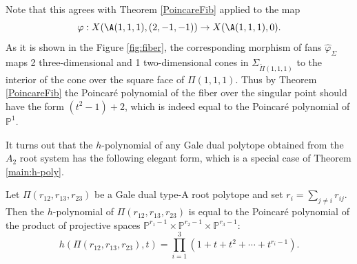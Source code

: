 \begin{rema}
Note that this agrees with Theorem \ref{PoincareFib} applied to the map 
$$\varphi: X(\A(1,1,1),(2,-1,-1)) \to X(\A(1,1,1), 0).$$ As it is shown in the 
Figure \ref{fig:fiber}, the corresponding morphism of fans 
$\widehat{\varphi}_\Sigma$ maps 2 three-dimensional and 1 two-dimensional cones 
in $\Sigma_{\widetilde{\Pi}(1,1,1)}$  to the interior of the cone over the 
square face of $\Pi(1,1,1)$. Thus by Theorem \ref{PoincareFib}  the Poincar\'e 
polynomial of the fiber over the singular point should have the form 
$(t^2-1)+2$, which is indeed equal to the Poincar\'e polynomial of 
$\mathbb{P}^1$.
\end{rema}


It turns out that the $h$-polynomial of any Gale dual polytope obtained from 
the $A_2$  root system has the following elegant form, which is a special case 
of Theorem \ref{main:h-poly}.

\begin{lemma}\label{hpoly3} Let $\Pi(r_{12},r_{13},r_{23})$ be a Gale dual type-A root polytope and set $r_i=\sum_{j\neq i} r_{ij}$. Then the $h$-polynomial of $\Pi(r_{12},r_{13},r_{23})$  is equal to the Poincar\'e polynomial of the product of projective spaces $\mathbb{P}^{r_1-1}\times \mathbb{P}^{r_2-1}\times \mathbb{P}^{r_3-1}:$
$$h(\Pi(r_{12},r_{13},r_{23}), t) = \prod_{i=1}^3(1+t+t^2+ \cdots +t^{r_i-1}).$$ 
\end{lemma}



